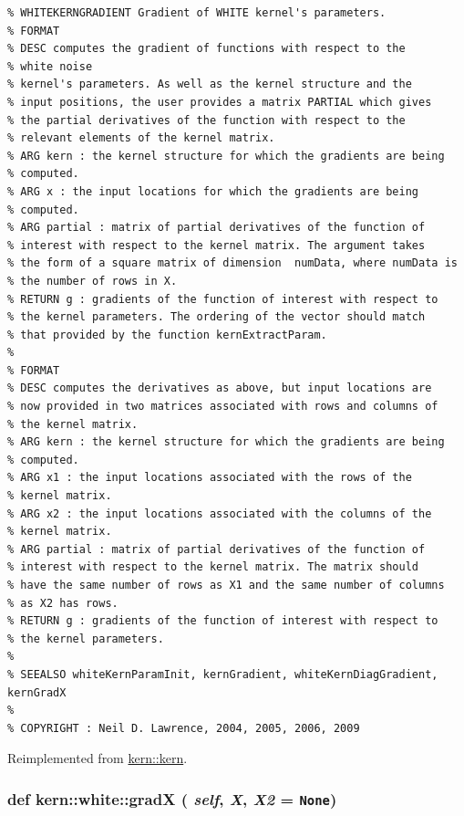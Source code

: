 \footnotesize\begin{verbatim}% WHITEKERNGRADIENT Gradient of WHITE kernel's parameters.
% FORMAT
% DESC computes the gradient of functions with respect to the
% white noise
% kernel's parameters. As well as the kernel structure and the
% input positions, the user provides a matrix PARTIAL which gives
% the partial derivatives of the function with respect to the
% relevant elements of the kernel matrix. 
% ARG kern : the kernel structure for which the gradients are being
% computed.
% ARG x : the input locations for which the gradients are being
% computed. 
% ARG partial : matrix of partial derivatives of the function of
% interest with respect to the kernel matrix. The argument takes
% the form of a square matrix of dimension  numData, where numData is
% the number of rows in X.
% RETURN g : gradients of the function of interest with respect to
% the kernel parameters. The ordering of the vector should match
% that provided by the function kernExtractParam.
%
% FORMAT
% DESC computes the derivatives as above, but input locations are
% now provided in two matrices associated with rows and columns of
% the kernel matrix. 
% ARG kern : the kernel structure for which the gradients are being
% computed.
% ARG x1 : the input locations associated with the rows of the
% kernel matrix.
% ARG x2 : the input locations associated with the columns of the
% kernel matrix.
% ARG partial : matrix of partial derivatives of the function of
% interest with respect to the kernel matrix. The matrix should
% have the same number of rows as X1 and the same number of columns
% as X2 has rows.
% RETURN g : gradients of the function of interest with respect to
% the kernel parameters.
%
% SEEALSO whiteKernParamInit, kernGradient, whiteKernDiagGradient, kernGradX
%
% COPYRIGHT : Neil D. Lawrence, 2004, 2005, 2006, 2009

\end{verbatim}
\normalsize
 

Reimplemented from \hyperlink{classkern_1_1kern}{kern::kern}.\hypertarget{classkern_1_1white_621f9c599dbfca7a038e9d5da8da8bc8}{
\subsubsection[{gradX}]{\setlength{\rightskip}{0pt plus 5cm}def kern::white::gradX ( {\em self}, \/   {\em X}, \/   {\em X2} = {\tt None})}}
\label{classkern_1_1white_621f9c599dbfca7a038e9d5da8da8bc8}




